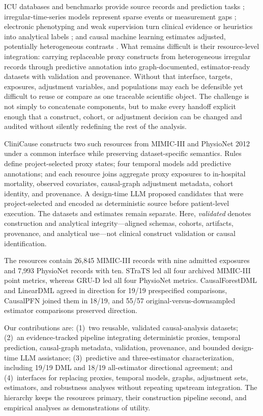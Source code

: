 \documentclass[letterpaper]{article}
\begin{document}
ICU databases and benchmarks provide source records and prediction tasks
\cite{johnson2016mimiciii,silva2012physionet,
harutyunyan_2019_mimiciii_benchmark}; irregular-time-series models represent
sparse events or measurement gaps \cite{tipirneni2022strats,che2018grud};
electronic phenotyping and weak supervision turn clinical evidence or heuristics
into analytical labels \cite{banda_2018_electronic_phenotyping,
ratner_et_al_2016_data_programming}; and causal machine learning estimates
adjusted, potentially heterogeneous contrasts \cite{chernozhukov2018dml,
wager2018causalforest}. What remains difficult is their resource-level
integration: carrying replaceable proxy constructs from heterogeneous irregular
records through predictive annotation into graph-documented, estimator-ready
datasets with validation and provenance. Without that interface, targets,
exposures, adjustment variables, and populations may each be defensible yet
difficult to reuse or compare as one traceable scientific object.
The challenge is not simply to concatenate components, but to make every
handoff explicit enough that a construct, cohort, or adjustment decision can be
changed and audited without silently redefining the rest of the analysis.

CliniCause constructs two such resources from MIMIC-III and PhysioNet 2012
under a common interface while preserving dataset-specific semantics. Rules
define project-selected proxy states; four temporal models add predictive
annotations; and each resource joins aggregate proxy exposures to in-hospital
mortality, observed covariates, causal-graph adjustment metadata, cohort
identity, and provenance. A design-time LLM proposed candidates that were
project-selected and encoded as deterministic source before patient-level
execution. The datasets and estimates remain separate. Here, \emph{validated}
denotes construction and analytical integrity---aligned schemas, cohorts,
artifacts, provenance, and analytical use---not clinical construct validation
or causal identification.

The resources contain 26,845 MIMIC-III records with nine admitted exposures and
7,993 PhysioNet records with ten. STraTS led all four archived MIMIC-III point
metrics, whereas GRU-D led all four PhysioNet metrics. CausalForestDML and
LinearDML agreed in direction for 19/19 prespecified comparisons, CausalPFN
joined them in 18/19, and 55/57 original-versus-downsampled estimator
comparisons preserved direction.

Our contributions are: (1)~two reusable, validated causal-analysis datasets;
(2)~an evidence-tracked pipeline integrating deterministic proxies, temporal
prediction, causal-graph metadata, validation, provenance, and bounded
design-time LLM assistance; (3)~predictive and three-estimator characterization,
including 19/19 DML and 18/19 all-estimator directional agreement; and
(4)~interfaces for replacing proxies, temporal models, graphs, adjustment sets,
estimators, and robustness analyses without repeating upstream integration.
The hierarchy keeps the resources primary, their construction pipeline second,
and empirical analyses as demonstrations of utility.
\end{document}
